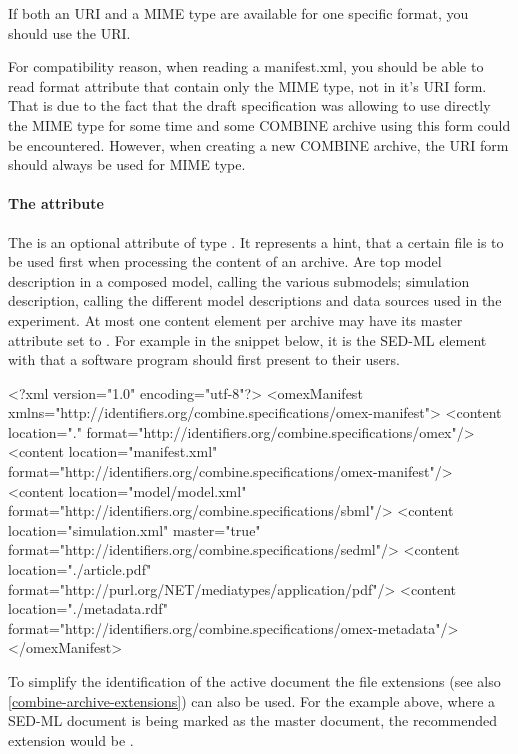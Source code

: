 If both an  URI and a MIME type are available for one specific format, you should use the
 URI. 

For compatibility reason, when reading a manifest.xml, you should be able to read format
attribute that contain only the MIME type, not in it's URI form. That is due to the fact that the draft specification
was allowing to use directly the MIME type for some time and some COMBINE archive using this form could be encountered.
However, when creating a new COMBINE archive, the URI form should always be used for MIME type.

\paragraph{The  attribute}
\label{active_document}
The  is an optional attribute of type . It 
represents a hint, that a certain file is to be used first when 
processing the content of an archive. Are top model description in a 
composed model, calling the various submodels; simulation description, 
calling the different model descriptions and data sources used in the 
experiment. At most one content element per archive may have its master 
attribute set to . For example in the snippet below, it is the 
SED-ML element with  that a software 
program should first present to their users.

\begin{example}
<?xml version="1.0" encoding="utf-8"?>
<omexManifest xmlns="http://identifiers.org/combine.specifications/omex-manifest">
    <content location="." 
		         format="http://identifiers.org/combine.specifications/omex"/>
    <content location="manifest.xml" 
		         format="http://identifiers.org/combine.specifications/omex-manifest"/>
    <content location="model/model.xml" 
		         format="http://identifiers.org/combine.specifications/sbml"/>
    <content location="simulation.xml" master="true"
		         format="http://identifiers.org/combine.specifications/sedml"/>
    <content location="./article.pdf" 
		         format="http://purl.org/NET/mediatypes/application/pdf"/>
    <content location="./metadata.rdf" 
		         format="http://identifiers.org/combine.specifications/omex-metadata"/>
</omexManifest>
\end{example}

To simplify the identification of the active document the file extensions 
(see also \ref{combine-archive-extensions}) can also be used. For the example above, 
where a SED-ML document is being marked as the master document, the 
recommended extension would be . 

